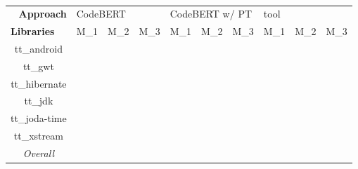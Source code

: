 \begin{table}[]
\centering
\begin{tabular}{c|llllll|lll}
\hline
\multicolumn{1}{r|}{\textbf{Approach}}  & \multicolumn{3}{l}{CodeBERT}            & \multicolumn{3}{l|}{CodeBERT w/ PT} & \multicolumn{3}{l}{tool} \\ \cline{2-10} 
\multicolumn{1}{l|}{\textbf{Libraries}} & M\_1 & M\_2 & \multicolumn{1}{l|}{M\_3} & M\_1       & M\_2       & M\_3      & M\_1   & M\_2   & M\_3   \\ \hline
tt\_android                             &      &      & \multicolumn{1}{l|}{}     &            &            &           &        &        &        \\
tt\_gwt                                 &      &      & \multicolumn{1}{l|}{}     &            &            &           &        &        &        \\
tt\_hibernate                           &      &      & \multicolumn{1}{l|}{}     &            &            &           &        &        &        \\
tt\_jdk                                 &      &      & \multicolumn{1}{l|}{}     &            &            &           &        &        &        \\
tt\_joda-time                           &      &      & \multicolumn{1}{l|}{}     &            &            &           &        &        &        \\
tt\_xstream                             &      &      & \multicolumn{1}{l|}{}     &            &            &           &        &        &        \\ \hline
\textit{Overall}                        &      &      & \multicolumn{1}{l|}{}     &            &            &           &        &        &       
\end{tabular}
\caption{}
\label{tab:eff-eval}
\end{table}